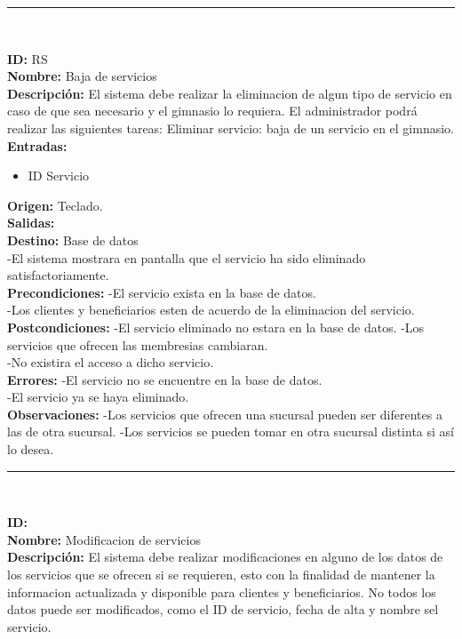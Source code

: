 \vspace*{0.3in}
\rule{150mm}{0.1mm}\\
\vspace*{0.1in}

\textbf{ID:} RS\\
\textbf{Nombre:}  Baja de servicios \\
\textbf{Descripción:} El sistema debe realizar la eliminacion de algun tipo de servicio en caso de que sea necesario y el gimnasio lo requiera.
El administrador podrá realizar las siguientes tareas:
Eliminar servicio: baja de un servicio en el gimnasio. \\
\textbf{Entradas:} 
  
  \begin{itemize}
		
		\item ID Servicio
 \end{itemize}

\textbf{Origen:}  Teclado.\\
\textbf{Salidas:}  \\
\textbf{Destino:} Base de datos \\
-El sistema mostrara en pantalla que el servicio ha sido eliminado satisfactoriamente.\\  
\textbf{Precondiciones:} 
-El servicio exista en la base de datos.\\
-Los clientes y beneficiarios esten de acuerdo de la eliminacion del servicio.
\textbf{Postcondiciones:} 
-El servicio eliminado no estara en la base de datos.
-Los servicios que ofrecen las membresias cambiaran. \\
-No existira el acceso a dicho servicio.\\
\textbf{Errores:} 
-El servicio no se encuentre en la base de datos.\\
-El servicio ya se haya eliminado.\\
\textbf{Observaciones:} 
-Los servicios que ofrecen una sucursal pueden ser diferentes a las de otra sucursal.
-Los servicios se pueden tomar en otra sucursal distinta si así lo desea.\\


\vspace*{0.3in}
\rule{150mm}{0.1mm}\\
\vspace*{0.1in}

\textbf{ID:} \\
\textbf{Nombre: } Modificacion de servicios \\
\textbf{Descripci\'on:} El sistema debe realizar modificaciones en alguno de los datos de los servicios que se ofrecen si se requieren, esto con la finalidad de mantener la informacion actualizada y disponible para clientes y beneficiarios. No todos los datos puede ser modificados, como el ID de servicio, fecha de alta y nombre sel servicio. 

